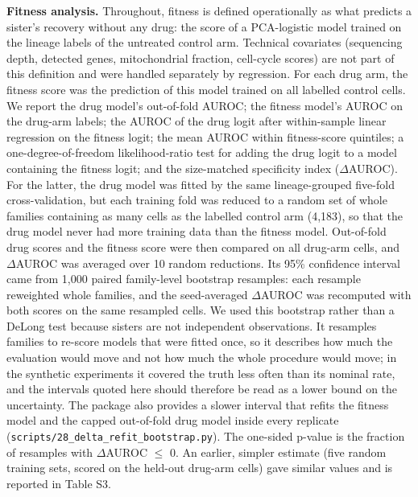 \documentclass[11pt,a4paper]{article}
\begin{document}
\textbf{Fitness analysis.} Throughout, fitness is defined operationally as what predicts a sister's recovery without any drug: the score of a PCA-logistic model trained on the lineage labels of the untreated control arm. Technical covariates (sequencing depth, detected genes, mitochondrial fraction, cell-cycle scores) are not part of this definition and were handled separately by regression. For each drug arm, the fitness score was the prediction of this model trained on all labelled control cells. We report the drug model's out-of-fold AUROC; the fitness model's AUROC on the drug-arm labels; the AUROC of the drug logit after within-sample linear regression on the fitness logit; the mean AUROC within fitness-score quintiles; a one-degree-of-freedom likelihood-ratio test for adding the drug logit to a model containing the fitness logit; and the size-matched specificity index ($\Delta$AUROC). For the latter, the drug model was fitted by the same lineage-grouped five-fold cross-validation, but each training fold was reduced to a random set of whole families containing as many cells as the labelled control arm (4,183), so that the drug model never had more training data than the fitness model. Out-of-fold drug scores and the fitness score were then compared on all drug-arm cells, and $\Delta$AUROC was averaged over 10 random reductions. Its 95\% confidence interval came from 1,000 paired family-level bootstrap resamples: each resample reweighted whole families, and the seed-averaged $\Delta$AUROC was recomputed with both scores on the same resampled cells. We used this bootstrap rather than a DeLong test because sisters are not independent observations. It resamples families to re-score models that were fitted once, so it describes how much the evaluation would move and not how much the whole procedure would move; in the synthetic experiments it covered the truth less often than its nominal rate, and the intervals quoted here should therefore be read as a lower bound on the uncertainty. The package also provides a slower interval that refits the fitness model and the capped out-of-fold drug model inside every replicate (\texttt{scripts/28\_delta\_refit\_bootstrap.py}). The one-sided p-value is the fraction of resamples with $\Delta$AUROC $\leq$ 0. An earlier, simpler estimate (five random training sets, scored on the held-out drug-arm cells) gave similar values and is reported in Table S3.
\end{document}
